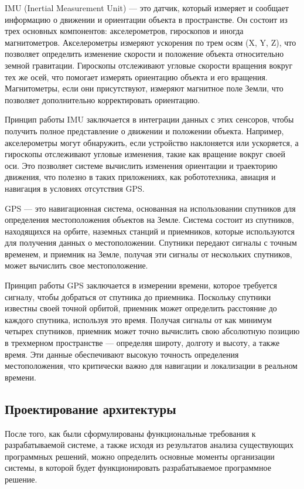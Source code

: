 IMU (Inertial Measurement Unit) — это датчик, который измеряет и сообщает
информацию о движении и ориентации объекта в пространстве. Он состоит из трех
основных компонентов: акселерометров, гироскопов и иногда магнитометров.
Акселерометры измеряют ускорения по трем осям (X, Y, Z), что позволяет
определить изменение скорости и положение объекта относительно земной
гравитации. Гироскопы отслеживают угловые скорости вращения вокруг тех же осей,
что помогает измерять ориентацию объекта и его вращения. Магнитометры, если они
присутствуют, измеряют магнитное поле Земли, что позволяет дополнительно
корректировать ориентацию.

Принцип работы IMU заключается в интеграции данных с этих сенсоров, чтобы
получить полное представление о движении и положении объекта. Например,
акселерометры могут обнаружить, если устройство наклоняется или ускоряется, а
гироскопы отслеживают угловые изменения, такие как вращение вокруг своей оси.
Это позволяет системе вычислить изменения ориентации и траекторию движения, что
полезно в таких приложениях, как робототехника, авиация и навигация в условиях
отсутствия GPS.

GPS — это навигационная система, основанная на использовании спутников для
определения местоположения объектов на Земле. Система состоит из спутников,
находящихся на орбите, наземных станций и приемников, которые используются для
получения данных о местоположении. Спутники передают сигналы с точным временем,
и приемник на Земле, получая эти сигналы от нескольких спутников, может
вычислить свое местоположение.

Принцип работы GPS заключается в измерении времени, которое требуется сигналу,
чтобы добраться от спутника до приемника. Поскольку спутники известны своей
точной орбитой, приемник может определить расстояние до каждого спутника,
используя это время. Получая сигналы от как минимум четырех спутников, приемник
может точно вычислить свою абсолютную позицию в трехмерном пространстве —
определяя широту, долготу и высоту, а также время. Эти данные обеспечивают
высокую точность определения местоположения, что критически важно для навигации
и локализации в реальном времени.


\subsection{Проектирование архитектуры}	

После того, как были сформулированы функциональные требования к разрабатываемой
системе,  а  также  исходя  из  результатов  анализа  существующих
программных решений, можно определить основные моменты организации системы,  в
которой  будет  функционировать  разрабатываемое  программное  решение.

